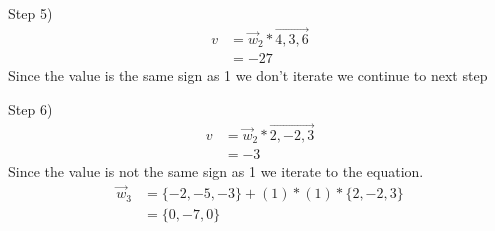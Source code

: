 \documentclass[12pt,english]{article}
\begin{document}
Step 5)
\begin{equation*}
\begin{split}
v&= \vec{w}_2 * \vec{4,3,6}\\
&= -27
\end{split}
\end{equation*}
Since the value is the same sign as 1 we don't iterate we continue to next step\par

Step 6)
\begin{equation*}
\begin{split}
v&= \vec{w}_2* \vec{2,-2,3}\\
&= -3
\end{split}
\end{equation*}
Since the value is not the same sign as 1 we iterate to the equation.
\begin{equation}\tag{2}
\begin{split}
\vec{w}_{3} &= \{-2,-5,-3\}+ (1) * (1) * \{2,-2,3 \}\\
&= \{0,-7,0 \}
\end{split}
\end{equation}
\end{document}
